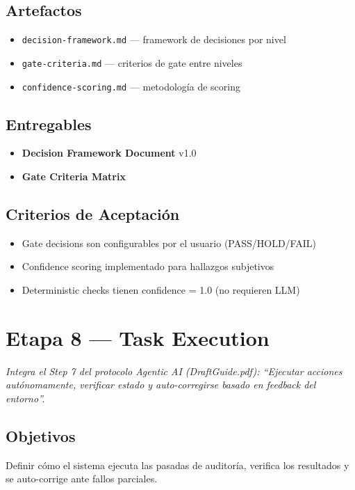 \documentclass[12pt,a4paper]{article}
\begin{document}
\subsection*{Artefactos}
\begin{itemize}
  \item \texttt{decision-framework.md} --- framework de decisiones por nivel
  \item \texttt{gate-criteria.md} --- criterios de gate entre niveles
  \item \texttt{confidence-scoring.md} --- metodología de scoring
\end{itemize}

\subsection*{Entregables}
\begin{itemize}
  \item \textbf{Decision Framework Document} v1.0
  \item \textbf{Gate Criteria Matrix}
\end{itemize}

\subsection*{Criterios de Aceptación}
\begin{itemize}
  \item[{${[\;]}$}] Gate decisions son configurables por el usuario (PASS/HOLD/FAIL)
  \item[{${[\;]}$}] Confidence scoring implementado para hallazgos subjetivos
  \item[{${[\;]}$}] Deterministic checks tienen confidence = 1.0 (no requieren LLM)
\end{itemize}

\section{Etapa 8 --- Task Execution}

\emph{Integra el Step 7 del protocolo Agentic AI (DraftGuide.pdf): ``Ejecutar acciones autónomamente, verificar estado y auto-corregirse basado en feedback del entorno''.}

\subsection*{Objetivos}
Definir cómo el sistema ejecuta las pasadas de auditoría, verifica los resultados y se auto-corrige ante fallos parciales.
\end{document}
